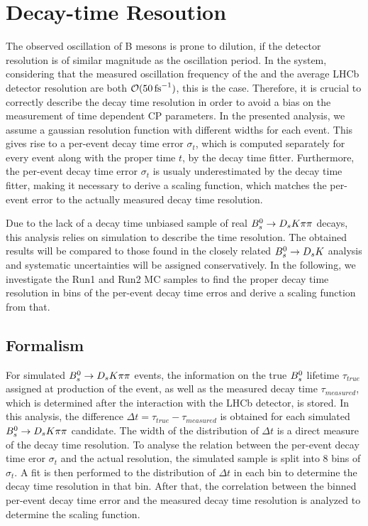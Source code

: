 
\section{Decay-time Resoution}
\label{sec:Resolution}

The observed oscillation of B mesons is prone to dilution, if the detector resolution is of similar magnitude as the oscillation period. 
In the \Bs system, considering that the measured oscillation frequency of the \Bs \cite{PDG2014} and the average LHCb detector resolution \cite{LHCb-DP-2014-002} are both $\mathcal{O}(50 \mathrm{ \,fs}^{-1})$, this is the case.
Therefore, it is crucial to correctly describe the decay time resolution in order to avoid a bias on the measurement of time dependent CP parameters. \newline
In the presented analysis, we assume a gaussian resolution function with different widths for each event. 
This gives rise to a per-event decay time error $\sigma_{t}$, which is computed separately for every event along with the proper time $t$, by the decay time fitter. 
Furthermore, the per-event decay time error $\sigma_{t}$ is usualy underestimated by the decay time fitter, 
making it necessary to derive a scaling function, which matches the per-event error to the actually measured decay time resolution. \newline

Due to the lack of a decay time unbiased sample of real ${{B}^0_{s}}\rightarrow{\ensuremath{{D}_{s}}}{\ensuremath{K}}{\ensuremath{\pi}}{\ensuremath{\pi}}$ decays, this analysis relies on simulation to describe the time resolution. 
The obtained results will be compared to those found in the closely related ${{B}^0_{s}}\rightarrow{\ensuremath{{D}_{s}}}{\ensuremath{K}}$ analysis and systematic uncertainties will be assigned conservatively.
In the following, we investigate the Run1 and Run2 MC samples to find the proper decay time resolution in bins of the per-event decay time erros and derive a scaling function from that.      

\subsection{Formalism} 

For simulated ${{B}^0_{s}}\rightarrow{\ensuremath{{D}_{s}}}{\ensuremath{K}}{\ensuremath{\pi}}{\ensuremath{\pi}}$ events, the information on the true ${{B}^0_{s}}$ lifetime $\tau_{true}$ assigned at production of the event, 
as well as the measured decay time $\tau_{measured}$, which is determined after the interaction with the LHCb detector, is stored. 
In this analysis, the difference $\Delta t = \tau_{true} - \tau_{measured}$ is obtained for each simulated ${{B}^0_{s}}\rightarrow{\ensuremath{{D}_{s}}}{\ensuremath{K}}{\ensuremath{\pi}}{\ensuremath{\pi}}$ candidate. 
The width of the distribution of $\Delta t$ is a direct measure of the decay time resolution. \newline 
To analyse the relation between the per-event decay time eror $\sigma_{t}$ and the actual resolution, the simulated sample is split into 8 bins of $\sigma_{t}$. 
A fit is then performed to the distribution of $\Delta t$ in each bin to determine the decay time resolution in that bin. 
After that, the correlation between the binned per-event decay time error and the measured decay time resolution is analyzed to determine the scaling function.     


